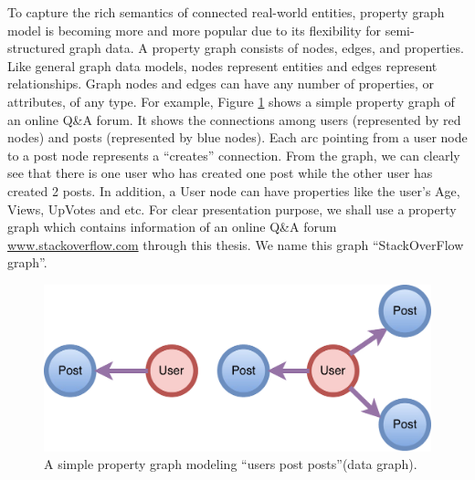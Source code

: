 To capture the rich semantics of connected real-world entities, property graph model \cite{DBLP:conf/mtsr/Tomaszuk16} is becoming more and more popular due to its flexibility for semi-structured graph data. A property graph consists of nodes, edges, and properties. Like general graph data models, nodes represent entities and edges represent relationships. Graph nodes and edges can have any number of properties, or attributes, of any type. For example, Figure \ref{fig:1} shows a simple property graph of an online Q\&A forum. It shows the connections among users (represented by red nodes) and posts (represented by blue nodes). Each arc pointing from a user node  to a post node represents a ``creates'' connection. From the graph, we can clearly see that  there is one user who has created one post while the other user has created 2 posts. In addition, a User node can have properties like the user’s Age, Views, UpVotes and etc. 
For clear presentation purpose, we shall use a property graph which contains information of an online Q\&A forum \url{www.stackoverflow.com} through this thesis. We name this graph ``StackOverFlow graph''.


\begin{figure}
	\centering
	\includegraphics[scale=0.4]{pic/11.pdf}
	\caption{A simple property graph modeling ``users post posts''(data graph).}
	\label{fig:1}
\end{figure}






